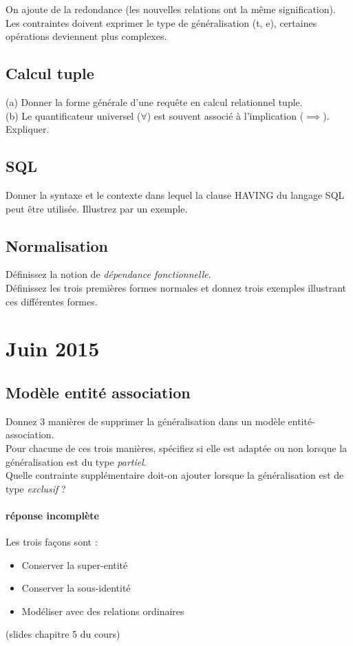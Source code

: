 On ajoute de la redondance (les nouvelles relations ont la m\^eme signification).
Les contraintes doivent exprimer le type de généralisation (t, e), 
certaines opérations deviennent plus complexes.

\subsection{Calcul tuple}

(a) Donner la forme générale d'une requête en calcul relationnel tuple.\\
(b) Le quantificateur universel ($\forall$) est souvent associé à l'implication 
($\implies$). Expliquer.

\subsection{SQL}
Donner la syntaxe et le contexte dans lequel la clause HAVING du langage SQL peut être 
utilisée. Illustrez par un exemple.

\subsection{Normalisation}
Définissez la notion de \textit{dépendance fonctionnelle}. \\
Définissez les trois premières formes normales et donnez trois exemples 
illustrant ces différentes formes.

\section{Juin 2015}

\subsection{Modèle entité association }

Donnez 3 manières de supprimer la généralisation dans un modèle entité-association.\\
Pour chacune de ces trois manières, spécifiez si elle est adaptée ou non lorsque la 
généralisation est du type \textit{partiel}.\\
Quelle contrainte supplémentaire doit-on ajouter lorsque la généralisation est 
de type \textit{exclusif} ?

\paragraph{réponse incomplète}
Les trois façons sont : 
\begin{itemize}
	\item Conserver la super-entité
	\item Conserver la sous-identité 
	\item Modéliser avec des relations ordinaires
\end{itemize}
(slides chapitre 5 du cours)

